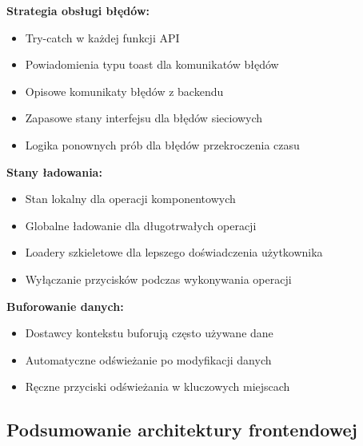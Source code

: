 \documentclass[12pt,a4paper]{article}
\begin{document}
\textbf{Strategia obsługi błędów:}
\begin{itemize}
    \item Try-catch w każdej funkcji API
    \item Powiadomienia typu toast dla komunikatów błędów
    \item Opisowe komunikaty błędów z backendu
    \item Zapasowe stany interfejsu dla błędów sieciowych
    \item Logika ponownych prób dla błędów przekroczenia czasu
\end{itemize}

\textbf{Stany ładowania:}
\begin{itemize}
    \item Stan lokalny dla operacji komponentowych
    \item Globalne ładowanie dla długotrwałych operacji
    \item Loadery szkieletowe dla lepszego doświadczenia użytkownika
    \item Wyłączanie przycisków podczas wykonywania operacji
\end{itemize}

\textbf{Buforowanie danych:}
\begin{itemize}
    \item Dostawcy kontekstu buforują często używane dane
    \item Automatyczne odświeżanie po modyfikacji danych
    \item Ręczne przyciski odświeżania w kluczowych miejscach
\end{itemize}

\subsection{Podsumowanie architektury frontendowej}
\end{document}
